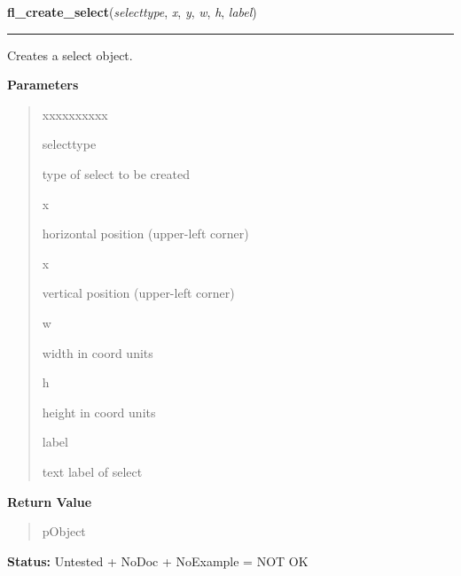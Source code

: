     \label{xformslib:library:fl_create_select}

    \vspace{0.5ex}

\hspace{.8\funcindent}\begin{boxedminipage}{\funcwidth}

    \raggedright \textbf{fl\_create\_select}(\textit{selecttype}, \textit{x}, \textit{y}, \textit{w}, \textit{h}, \textit{label})

    \vspace{-1.5ex}

    \rule{\textwidth}{0.5\fboxrule}
\setlength{\parskip}{2ex}
    Creates a select object.

\setlength{\parskip}{1ex}
      \textbf{Parameters}
      \vspace{-1ex}

      \begin{quote}
        \begin{Ventry}{xxxxxxxxxx}

          \item[selecttype]

          type of select to be created

          \item[x]

          horizontal position (upper-left corner)

          \item[x]

          vertical position (upper-left corner)

          \item[w]

          width in coord units

          \item[h]

          height in coord units

          \item[label]

          text label of select

        \end{Ventry}

      \end{quote}

      \textbf{Return Value}
    \vspace{-1ex}

      \begin{quote}
      pObject

      \end{quote}

\textbf{Status:} Untested + NoDoc + NoExample = NOT OK



    \end{boxedminipage}

